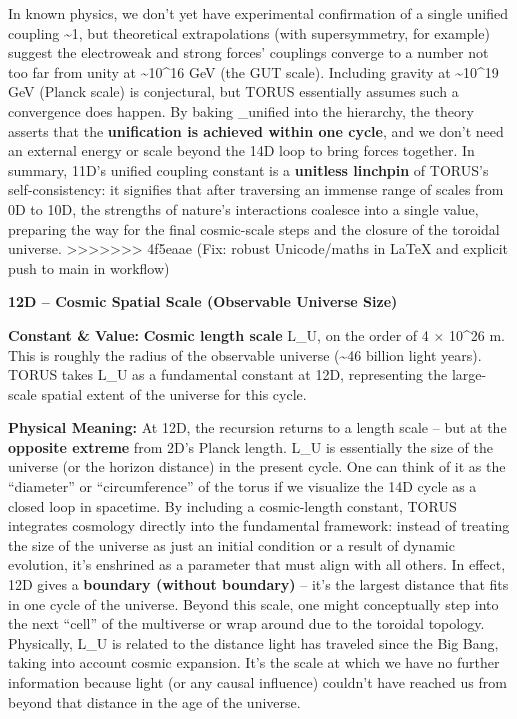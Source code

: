 \documentclass[]{article}
\begin{document}
In known physics, we don't yet have experimental confirmation of a
single unified coupling \textasciitilde{}1, but theoretical
extrapolations (with supersymmetry, for example) suggest the electroweak
and strong forces' couplings converge to a number not too far from unity
at \textasciitilde{}10\^{}16 GeV (the GUT scale)​. Including gravity at
\textasciitilde{}10\^{}19 GeV (Planck scale) is conjectural, but TORUS
essentially assumes such a convergence does happen. By baking \alpha\_unified
 into the hierarchy, the theory asserts that the \textbf{unification
is achieved within one cycle}, and we don't need an external energy or
scale beyond the 14D loop to bring forces together. In summary, 11D's
unified coupling constant is a \textbf{unitless linchpin} of TORUS's
self-consistency: it signifies that after traversing an immense range of
scales from 0D to 10D, the strengths of nature's interactions coalesce
into a single value, preparing the way for the final cosmic-scale steps
and the closure of the toroidal universe.
>>>>>>> 4f5eaae (Fix: robust Unicode/maths in LaTeX and explicit push to main in workflow)

\textbf{12D -- Cosmic Spatial Scale (Observable Universe Size)}

\textbf{Constant \& Value:} \textbf{Cosmic length scale} L\_U, on the
order of 4 × 10\^{}26 m​. This is roughly the radius of the observable
universe (\textasciitilde{}46 billion light years). TORUS takes L\_U as
a fundamental constant at 12D, representing the large-scale spatial
extent of the universe for this cycle.

\textbf{Physical Meaning:} At 12D, the recursion returns to a length
scale -- but at the \textbf{opposite extreme} from 2D's Planck length.
L\_U is essentially the size of the universe (or the horizon distance)
in the present cycle​. One can think of it as the ``diameter'' or
``circumference'' of the torus if we visualize the 14D cycle as a closed
loop in spacetime​. By including a cosmic-length constant, TORUS
integrates cosmology directly into the fundamental framework: instead of
treating the size of the universe as just an initial condition or a
result of dynamic evolution, it's enshrined as a parameter that must
align with all others. In effect, 12D gives a \textbf{boundary (without
boundary)} -- it's the largest distance that fits in one cycle of the
universe. Beyond this scale, one might conceptually step into the next
``cell'' of the multiverse or wrap around due to the toroidal topology.
Physically, L\_U is related to the distance light has traveled since the
Big Bang, taking into account cosmic expansion. It's the scale at which
we have no further information because light (or any causal influence)
couldn't have reached us from beyond that distance in the age of the
universe.
\end{document}
